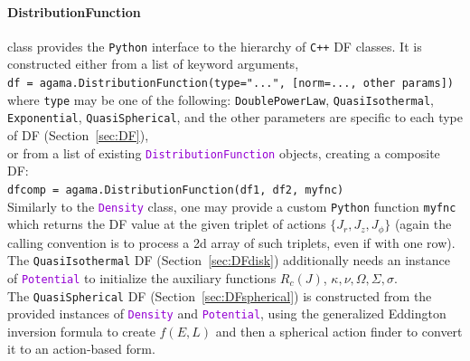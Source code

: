 \documentclass[12pt]{article}
\newcommand{\Cpp}  {\texttt{C++}\xspace}
\newcommand{\Python}{\texttt{Python}\xspace}
\newcommand{\ttt}[1]{\textcolor{darkviolet}{\texttt{#1}}}
\newcommand{\ppp}[1]{\textcolor{darkolive} {\texttt{#1}}}
\begin{document}
\paragraph{DistributionFunction} class provides the \Python interface to the hierarchy of \Cpp DF classes. It is constructed either from a list of keyword arguments,\\
\texttt{df = agama.DistributionFunction(type="...", [norm=..., other params])}\\
where \ppp{type} may be one of the following: \ppp{DoublePowerLaw}, \ppp{QuasiIsothermal}, \ppp{Exponential}, \ppp{QuasiSpherical}, and the other parameters are specific to each type of DF (Section~\ref{sec:DF}), \\
or from a list of existing \ttt{DistributionFunction} objects, creating a composite DF:\\
\texttt{dfcomp = agama.DistributionFunction(df1, df2, myfnc)}\\[2mm]
Similarly to the \ttt{Density} class, one may provide a custom \Python function \texttt{myfnc} which returns the DF value at the given triplet of actions $\{J_r,J_z,J_\phi\}$ (again the calling convention is to process a 2d array of such triplets, even if with one row).\\[2mm]
The \ppp{QuasiIsothermal} DF (Section~\ref{sec:DFdisk}) additionally needs an instance of \ttt{Potential} to initialize the auxiliary functions $R_c(J)$, $\kappa,\nu,\Omega,\Sigma,\sigma$.\\[2mm]
The \ppp{QuasiSpherical} DF (Section~\ref{sec:DFspherical}) is constructed from the provided instances of \ttt{Density} and \ttt{Potential}, using the generalized Eddington inversion formula to create $f(E,L)$ and then a spherical action finder to convert it to an action-based form.
\end{document}
